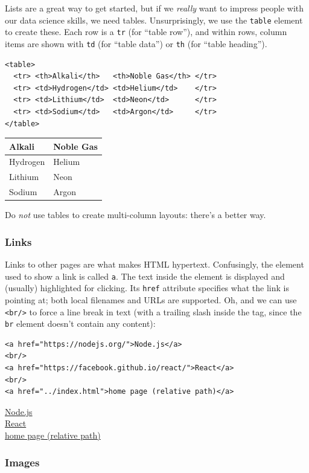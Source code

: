 Lists are a great way to get started, but if we \emph{really} want to
impress people with our data science skills, we need tables.
Unsurprisingly, we use the \texttt{table} element to create these. Each
row is a \texttt{tr} (for ``table row''), and within rows, column items
are shown with \texttt{td} (for ``table data'') or \texttt{th} (for
``table heading'').

\begin{verbatim}
<table>
  <tr> <th>Alkali</th>   <th>Noble Gas</th> </tr>
  <tr> <td>Hydrogen</td> <td>Helium</td>    </tr>
  <tr> <td>Lithium</td>  <td>Neon</td>      </tr>
  <tr> <td>Sodium</td>   <td>Argon</td>     </tr>
</table>
\end{verbatim}

\begin{longtable}[]{@{}ll@{}}
\toprule
Alkali & Noble Gas\tabularnewline
\midrule
\endhead
Hydrogen & Helium\tabularnewline
Lithium & Neon\tabularnewline
Sodium & Argon\tabularnewline
\bottomrule
\end{longtable}

Do \emph{not} use tables to create multi-column layouts: there's a
better way.

\subsubsection{Links}\label{s:htmlcss-links}

Links to other pages are what makes HTML hypertext. Confusingly, the
element used to show a link is called \texttt{a}. The text inside the
element is displayed and (usually) highlighted for clicking. Its
\texttt{href} attribute specifies what the link is pointing at; both
local filenames and URLs are supported. Oh, and we can use
\texttt{\textless{}br/\textgreater{}} to force a line break in text
(with a trailing slash inside the tag, since the \texttt{br} element
doesn't contain any content):

\begin{verbatim}
<a href="https://nodejs.org/">Node.js</a>
<br/>
<a href="https://facebook.github.io/react/">React</a>
<br/>
<a href="../index.html">home page (relative path)</a>
\end{verbatim}

\href{https://nodejs.org/}{Node.js}\\
\href{https://facebook.github.io/react/}{React}\\
\href{../index.html}{home page (relative path)}

\subsubsection{Images}\label{s:htmlcss-images}

